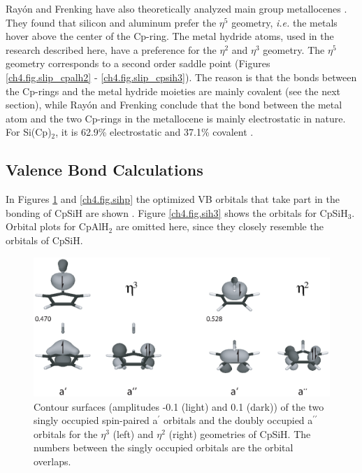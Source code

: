 Ray\'on and Frenking have also theoretically analyzed main group metallocenes \cite{rayon}. They found that silicon and aluminum prefer the $\eta^5$ geometry, \textit{i.e.} the metals hover above the center of the Cp-ring. The metal hydride atoms, used in the research described here, have a preference for the $\eta^2$ and $\eta^3$ geometry. The $\eta^5$ geometry corresponds to a second order saddle point (Figures \ref{ch4.fig.slip_cpalh2} - \ref{ch4.fig.slip_cpsih3}). The reason is that the bonds between the Cp-rings and the metal hydride moieties are mainly covalent (see the next section), while Ray\'on and Frenking conclude that the bond between the metal atom and the two Cp-rings in the metallocene is mainly electrostatic in nature. For Si(Cp)$_2$, it is 62.9\% electrostatic and 37.1\% covalent \cite{rayon}.

\subsection{Valence Bond Calculations}

In Figures \ref{ch4.fig.sihs} and \ref{ch4.fig.sihp} the optimized VB orbitals that take part in the bonding of CpSiH are shown \cite{molden}. Figure \ref{ch4.fig.sih3} shows the orbitals for CpSiH$_3$. Orbital plots for CpAlH$_2$ are omitted here, since they closely resemble the orbitals of CpSiH. 

\begin{figure} [htbp]
\begin{center}
\includegraphics[scale=0.67]{cyclopentadienyl/figures/sih_sigma.eps}
\end{center}
\caption{Contour surfaces (amplitudes -0.1 (light) and 0.1 (dark)) of the two singly occupied spin-paired a$^\prime$ orbitals and the doubly occupied a$^{\prime\prime}$ orbitals for the $\eta^{3}$ (left) and $\eta^{2}$ (right) geometries of CpSiH. The numbers between the singly occupied orbitals are the orbital overlaps.}
\label{ch4.fig.sihs}
\end{figure}

